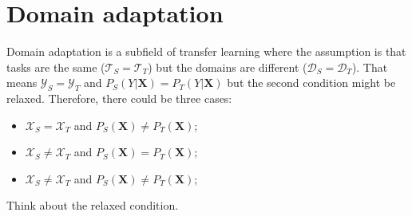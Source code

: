 \section{Domain adaptation}

Domain adaptation is a subfield of transfer learning where the assumption is that tasks are the same (\(\mathcal{T}_S = \mathcal{T}_T\)) but the domains are different (\(\mathcal{D}_S = \mathcal{D}_T\)). That means \(\mathcal{Y}_S = \mathcal{Y}_T\) and \(P_S(Y | \mathbf{X}) = P_T(Y | \mathbf{X})\) but the second condition might be relaxed. Therefore, there could be three cases:

\begin{itemize}
    \item \(\mathcal{X}_S = \mathcal{X}_T\) and \(P_S(\mathbf{X}) \neq P_T(\mathbf{X})\);
    \item \(\mathcal{X}_S \neq \mathcal{X}_T\) and \(P_S(\mathbf{X}) = P_T(\mathbf{X})\);
    \item \(\mathcal{X}_S \neq \mathcal{X}_T\) and \(P_S(\mathbf{X}) \neq P_T(\mathbf{X})\);
\end{itemize}

Think about the relaxed condition.
